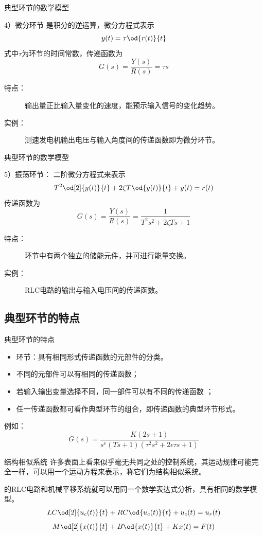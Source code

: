 \documentclass[handout,cjkutf8,table,aspectratio=1610]{beamer} %
\begin{document}
\begin{frame}{典型环节的数学模型}
\begin{block}{4）微分环节}
是积分的逆运算，微分方程式表示
$$y(t)=\tau\od{r(t)}{t}$$
式中$\tau$为环节的时间常数，传递函数为
$$G(s)=\frac{Y(s)}{R(s)}=\tau s$$
\begin{description}
\item[特点：]输出量正比输入量变化的速度，能预示输入信号的变化趋势。
\item[实例：]测速发电机输出电压与输入角度间的传递函数即为微分环节。
\end{description}
\end{block}
\end{frame}

\begin{frame}{典型环节的数学模型}
\begin{block}{5）振荡环节：}
二阶微分方程式来表示
$$T^2\od[2]{y(t)}{t}+2\zeta T\od{y(t)}{t}+y(t)=r(t)$$
传递函数为
$$G(s)=\frac{Y(s)}{R(s)}=\frac{1}{T^2s^2+2\zeta Ts+1}$$
\begin{description}
\item[特点：]环节中有两个独立的储能元件，并可进行能量交换。
\item[实例：]RLC电路的输出与输入电压间的传递函数。
\end{description}
\end{block}
\end{frame}

\subsection{典型环节的特点}
\begin{frame}{典型环节的特点}
\begin{itemize}
\item 环节：具有相同形式传递函数的元部件的分类。
\item 不同的元部件可以有相同的传递函数；
\item 若输入输出变量选择不同，同一部件可以有不同的传递函数 ；
\item 任一传递函数都可看作典型环节的组合，即传递函数的典型环节形式。
\end{itemize}
例如：
$$G(s)=\frac{K(2s+1)}{s^v(Ts+1)(\tau^2s^2+2\epsilon\tau s+1)}$$
\end{frame}

\begin{frame}{结构相似系统}
许多表面上看来似乎毫无共同之处的控制系统，其运动规律可能完全一样，可以用一个运动方程来表示，称它们为结构相似系统。
  
的RLC电路和机械平移系统就可以用同一个数学表达式分析，具有相同的数学模型。
$$LC\od[2]{u_c(t)}{t}+RC\od{u_c(t)}{t}+u_c(t)=u_r(t)$$
$$M\od[2]{x(t)}{t}+B\od{x(t)}{t}+Kx(t)=F(t)$$
\end{frame}
\end{document}
